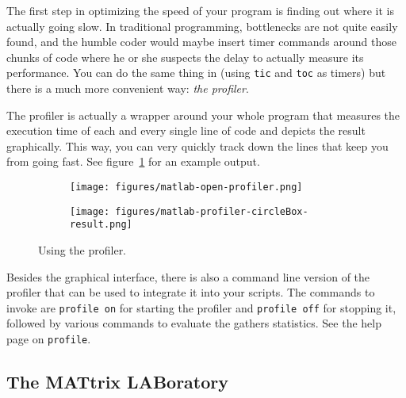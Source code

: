 The first step in optimizing the speed of your program is finding out where it
is actually going slow. In traditional programming, bottlenecks are not quite
easily found, and the humble coder would maybe insert timer commands around
those chunks of code where he or she suspects the delay to actually measure
its performance. You can do the same thing in \matlab{} (using \lstinline!tic!
and \lstinline!toc! as timers) but there is a much more convenient way:
\emph{the profiler}.

The profiler is actually a wrapper around your whole program that measures the
execution time of each and every single line of code and depicts the result
graphically. This way, you can very quickly track down the lines that keep you
from going fast. See figure~\ref{figure:profiler} for an example output.

\begin{figure}
\centering
\begin{subfigure}[b]{0.45\textwidth}
  \texttt{[image: figures/matlab-open-profiler.png]}
\end{subfigure}
\hfill
\begin{subfigure}[b]{0.45\textwidth}
  \texttt{[image: figures/matlab-profiler-circleBox-result.png]}
\end{subfigure}
\caption{Using the profiler.}
\label{figure:profiler}
\end{figure}

\begin{remark}
Besides the graphical interface, there is also a command line version of the
profiler that can be used to integrate it into your scripts. The commands to
invoke are \lstinline!profile on! for starting the profiler and
\lstinline!profile off! for stopping it, followed by various commands to
evaluate the gathers statistics. See the \matlab{} help page on
\lstinline!profile!.
\end{remark}


\subsection{The MATtrix LABoratory}

